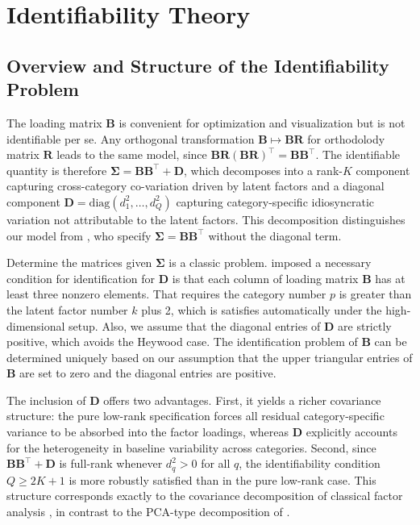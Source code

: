 \documentclass[]{report}
\theoremstyle{definition}
\begin{document}
\section{Identifiability Theory}
\subsection{Overview and Structure of the Identifiability Problem}
The loading matrix $\mathbf{B}$ is convenient for optimization and visualization but is not identifiable per se. Any orthogonal transformation $\mathbf{B} \mapsto \mathbf{BR}$ for orthodolody matrix $\mathbf{R}$ leads to the same model, since $\mathbf{BR}(\mathbf{BR})^\top = \mathbf{BB}^\top$. The identifiable quantity is therefore $\boldsymbol{\Sigma} = \mathbf{BB}^\top + \mathbf{D}$, which decomposes into a rank-$K$ component capturing cross-category co-variation driven by latent factors and a diagonal component $\mathbf{D} = \mathrm{diag}(d_1^2, \ldots, d_Q^2)$ capturing category-specific idiosyncratic variation not attributable to the latent factors. This decomposition distinguishes our model from \citet{chiquet2018variational}, who specify $\boldsymbol{\Sigma} = \mathbf{BB}^\top$ without the diagonal term. 

Determine the matrices given $\bm{\Sigma}$ is a classic problem. \cite{Anderson1956StatisticalII} imposed a necessary condition for identification for $\mathbf{D}$ is that each column of loading matrix $\mathbf{B}$ has at least three nonzero elements. That requires the category number $p$ is greater than the latent factor number $k$ plus 2, which is satisfies automatically under the high-dimensional setup. Also, we assume that the diagonal entries of $\mathbf{D}$ are strictly positive, which avoids the Heywood case. The identification problem of $\mathbf{B}$ can be determined uniquely based on our assumption that the upper triangular entries of $\mathbf{B}$ are set to zero and the diagonal entries are positive.

The inclusion of $\mathbf{D}$ offers two advantages. First, it yields a richer covariance structure: the pure low-rank specification forces all residual category-specific variance to be absorbed into the factor loadings, whereas $\mathbf{D}$ explicitly accounts for the heterogeneity in baseline variability across categories. Second, since $\mathbf{BB}^\top + \mathbf{D}$ is full-rank whenever $d_q^2 > 0$ for all $q$, the identifiability condition $Q \geq 2K + 1$ is more robustly satisfied than in the pure low-rank case. This structure corresponds exactly to the covariance decomposition of classical factor analysis \cite{Anderson1956StatisticalII}, in contrast to the PCA-type decomposition of \citet{chiquet2018variational}.
\end{document}
